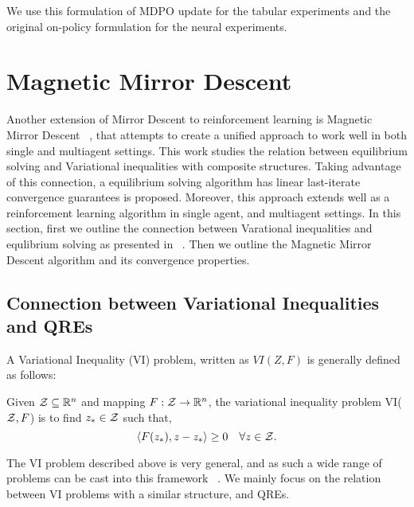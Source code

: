 We use this formulation of MDPO update for the tabular experiments and the
original on-policy formulation for the neural experiments.

\section[MMD]{Magnetic Mirror Descent}

Another extension of Mirror Descent to reinforcement learning is Magnetic Mirror Descent~
\cite{sokotaUnified2023}, that attempts to create a unified approach to work well in both single
and multiagent settings.
This work studies the relation between equilibrium solving and Variational inequalities with
composite structures.
Taking advantage of this connection, a equilibrium solving algorithm has linear last-iterate
convergence guarantees is proposed.
Moreover, this approach extends well as a reinforcement learning algorithm in single agent, and
multiagent settings.
In this section, first we outline the connection between Varational inequalities and equlibrium
solving as presented in~ \cite{sokotaUnified2023}.
Then we outline the Magnetic Mirror Descent algorithm and its convergence properties.

\subsection{Connection between Variational Inequalities and QREs}
A Variational Inequality (VI) problem, written as $VI(Z, F)$ is generally defined as follows:
\begin{definition}
	\label{def:vi} Given $\mathcal{Z} \subseteq \mathbb{R}^n$ and mapping $F: \mathcal{Z} \rightarrow
		\mathbb{R}^n$, the variational inequality problem VI($\mathcal{Z}, F$) is to find $z_{\ast} \in \mathcal{Z}$ such that,
	\[ \langle F(z_{\ast}), z - z_{\ast} \rangle \geq 0 \quad \forall z \in \mathcal{Z}.
	\]
\end{definition}

The VI problem described above is very general, and as such a wide range of problems can be cast
into this framework~ \cite{facchineiFiniteDimensional2004}.
We mainly focus on the relation between VI problems with a similar structure, and QREs.

